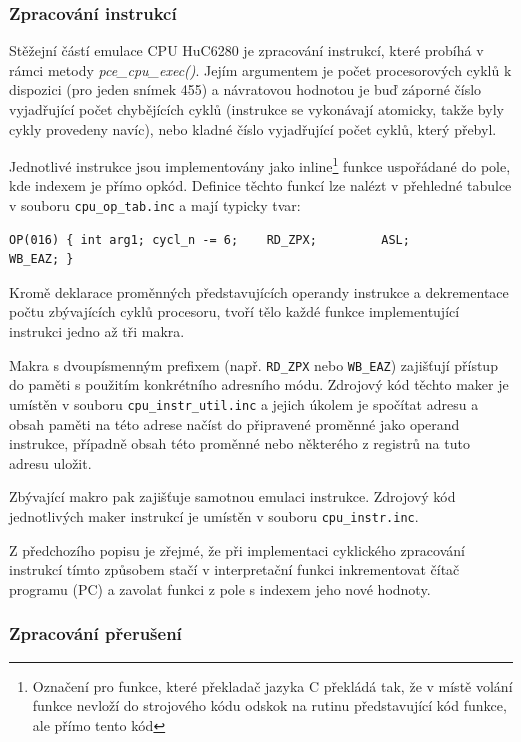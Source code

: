 
\subsubsection{Zpracování instrukcí}

Stěžejní částí emulace CPU HuC6280 je zpracování instrukcí, které probíhá v
rámci metody {\it pce\_cpu\_exec()}. Jejím argumentem je počet procesorových
cyklů k dispozici (pro jeden snímek 455) a návratovou hodnotou je buď záporné
číslo vyjadřující počet chybějících cyklů (instrukce se vykonávají atomicky,
takže byly cykly provedeny navíc), nebo kladné číslo vyjadřující počet cyklů,
který přebyl.

Jednotlivé instrukce jsou implementovány jako inline\footnote{Označení pro
funkce, které překladač jazyka C překládá tak, že v místě volání funkce nevloží
do strojového kódu odskok na rutinu představující kód funkce, ale přímo tento
kód} funkce uspořádané do pole, kde indexem je přímo opkód. Definice těchto
funkcí lze nalézt v přehledné tabulce v souboru {\tt cpu\_op\_tab.inc} a mají
typicky tvar:

\begin{verbatim}
OP(016) { int arg1; cycl_n -= 6;    RD_ZPX;         ASL;        WB_EAZ; }
\end{verbatim}

Kromě deklarace proměnných představujících operandy instrukce a dekrementace
počtu zbývajících cyklů procesoru, tvoří tělo každé funkce implementující
instrukci jedno až tři makra.

Makra s dvoupísmenným prefixem (např. {\tt RD\_ZPX} nebo {\tt WB\_EAZ})
zajišťují přístup do paměti s použitím konkrétního adresního módu. Zdrojový kód
těchto maker je umístěn v souboru {\tt cpu\_instr\_util.inc} a jejich úkolem je
spočítat adresu a obsah paměti na této adrese načíst do připravené proměnné
jako operand instrukce, případně obsah této proměnné nebo některého z registrů
na tuto adresu uložit.

Zbývající makro pak zajišťuje samotnou emulaci instrukce. Zdrojový kód
jednotlivých maker instrukcí je umístěn v souboru {\tt cpu\_instr.inc}.

Z předchozího popisu je zřejmé, že při implementaci cyklického zpracování
instrukcí tímto způsobem stačí v interpretační funkci inkrementovat čítač
programu ({\sf PC}) a zavolat funkci z pole s indexem jeho nové hodnoty.


\subsubsection{Zpracování přerušení}

